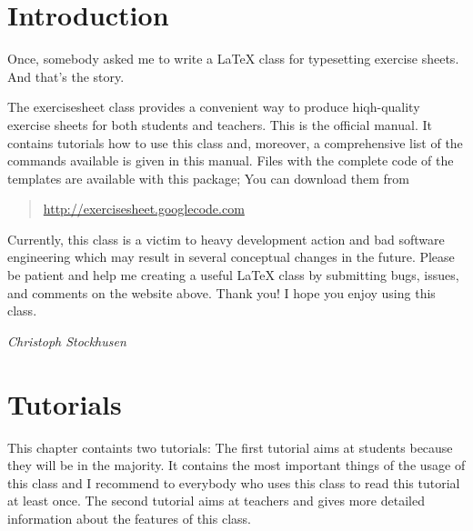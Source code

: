 \documentclass[a4paper,fleqn,9pt]{report}
\let\sffamily=\rmfamily
\def\exercisesheet{{exercisesheet}}
\begin{document}



\chapter*{Introduction}

Once, somebody asked me to write a \LaTeX{} class for typesetting
exercise sheets. And that's the story.

\medskip

\noindent The \exercisesheet{} class provides a convenient way to
produce hiqh-quality exercise sheets for both students and teachers.
This is the official manual. It contains tutorials how to use this
class and, moreover, a comprehensive list of the commands available is
given in this manual. Files with the complete code of the templates
are available with this package; You can download them from 
\begin{quote}
  \url{http://exercisesheet.googlecode.com} 
\end{quote}
Currently, this class is a victim to heavy development action and bad
software engineering which may result in several conceptual changes in
the future. Please be patient and help me creating a useful \LaTeX{}
class by submitting bugs, issues, and comments on the website above.
Thank you! I hope you enjoy using this class.

\medskip\hfill{\itshape Christoph Stockhusen}

\tableofcontents

\chapter{Tutorials}

This chapter containts two tutorials: The first tutorial aims at
students because they will be in the majority. It contains the most
important things of the usage of this class and I recommend to
everybody who uses this class to read this tutorial at least once. The
second tutorial aims at teachers and gives more detailed information
about the features of this class.
\end{document}
